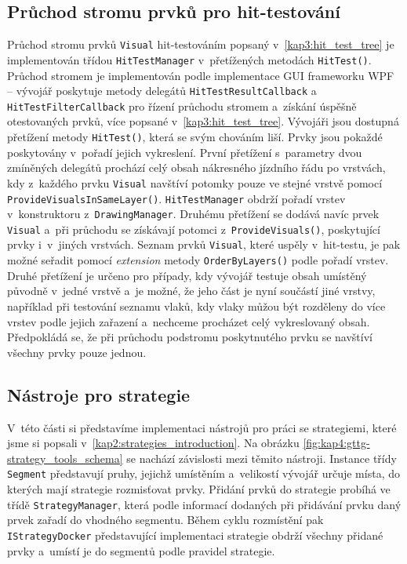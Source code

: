 \subsection{Průchod stromu prvků pro hit-testování}
Průchod stromu prvků \texttt{Visual} hit-testováním popsaný v~\ref{kap3:hit_test_tree} je implementován třídou \texttt{HitTestManager} v~přetížených metodách \texttt{HitTest()}. Průchod stromem je implementován podle implementace GUI frameworku WPF -- vývojář poskytuje metody delegátů \texttt{HitTestResultCallback} a~
\texttt{HitTestFilterCallback} pro řízení průchodu stromem a~získání úspěšně otestovaných prvků, více popsané v~\ref{kap3:hit_test_tree}. Vývojáři jsou dostupná přetížení metody \texttt{HitTest()}, která se svým chováním liší. Prvky jsou pokaždé poskytovány v~pořadí jejich vykreslení. První přetížení s~parametry dvou zmíněných delegátů prochází celý obsah nákresného jízdního řádu po vrstvách, kdy z~každého prvku \texttt{Visual} navštíví potomky pouze ve stejné vrstvě pomocí \texttt{ProvideVisualsInSameLayer()}. \texttt{HitTestManager} obdrží pořadí vrstev v~konstruktoru z~\texttt{DrawingManager}.
Druhému přetížení se dodává navíc prvek \texttt{Visual} a~při průchodu se získávají potomci z~\texttt{ProvideVisuals()}, poskytující prvky i~v~jiných vrstvách. Seznam prvků \texttt{Visual}, které uspěly v~hit-testu, je pak možné seřadit pomocí \textit{extension} metody \texttt{OrderByLayers()} podle pořadí vrstev. Druhé přetížení je určeno pro případy, kdy vývojář testuje obsah umístěný původně v~jedné vrstvě a~je možné, že jeho část je nyní součástí jiné vrstvy, například při testování seznamu vlaků, kdy vlaky můžou být rozděleny do více vrstev podle jejich zařazení a~nechceme procházet celý vykreslovaný obsah. Předpokládá se, že při průchodu podstromu poskytnutého prvku se navštíví všechny prvky pouze jednou.

\subsection{Nástroje pro strategie}
V~této části si představíme implementaci nástrojů pro práci se strategiemi, které jsme si popsali v~\ref{kap2:strategies_introduction}. Na obrázku \ref{fig:kap4:gttg-strategy_tools_schema} se nachází závislosti mezi těmito nástroji. Instance třídy \texttt{Segment} představují pruhy, jejichž umístěním a~velikostí vývojář určuje místa, do kterých mají strategie rozmisťovat prvky. Přidání prvků do strategie probíhá ve třídě \texttt{StrategyManager}, která podle informací dodaných při přidávání prvku daný prvek zařadí do vhodného segmentu. Během cyklu rozmístění pak \texttt{IStrategyDocker} představující implementaci strategie obdrží všechny přidané prvky a~umístí je do segmentů podle pravidel strategie.

